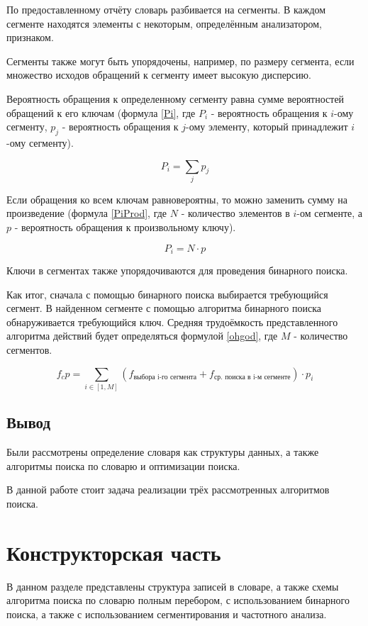 \documentclass[12pt]{report}
\begin{document}
По предоставленному отчёту словарь разбивается на сегменты. В каждом сегменте находятся элементы с некоторым, определённым анализатором, признаком.

Сегменты также могут быть упорядочены, например, по размеру сегмента, если множество исходов обращений к сегменту имеет высокую дисперсию.

Вероятность обращения к определенному сегменту равна сумме вероятностей обращений к его ключам (формула \ref{Pi}, где $P_i$ - вероятность обращения к $i$-ому сегменту, $p_j$ - вероятность обращения к $j$-ому элементу, который принадлежит $i$-ому сегменту).

\begin{equation}
\label{Pi}
P_i = \sum_{j}p_j
\end{equation}

Если обращения ко всем ключам равновероятны, то можно заменить сумму на произведение (формула \ref{PiProd}, где $N$ - количество элементов в $i$-ом сегменте, а $p$ - вероятность обращения к произвольному ключу).

\begin{equation}
\label{PiProd}
P_i = N \cdot p
\end{equation}

Ключи в сегментах также упорядочиваются для проведения бинарного поиска.

Как итог, сначала с помощью бинарного поиска выбирается требующийся сегмент. В найденном сегменте с помощью алгоритма бинарного поиска обнаруживается требующийся ключ. Средняя трудоёмкость представленного алгоритма действий будет определяться формулой \ref{ohgod}, где $M$ - количество сегментов.

\begin{equation}
    \label{ohgod}
    f_cp = \sum_{i \in [1, M]}{\left(f_{\text{выбора i-го сегмента}} + f_{\text{ср. поиска в i-м сегменте}}\right)} \cdot p_i
\end{equation}


\section*{Вывод}
Были рассмотрены определение словаря как структуры данных, а также алгоритмы поиска по словарю и оптимизации поиска.

В данной работе стоит задача реализации трёх рассмотренных алгоритмов поиска.

\chapter{Конструкторская часть}
В данном разделе представлены структура записей в словаре, а также схемы алгоритма поиска по словарю полным перебором, с использованием бинарного поиска, а также с использованием сегментирования и частотного анализа.
\end{document}
